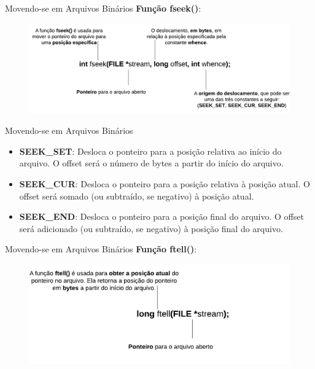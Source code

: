 \begin{frame}{Movendo-se em Arquivos Binários}
\textbf{Função fseek()}:
    \begin{figure}
        \centering
        \includegraphics[width=1\linewidth]{figuras/movebin.png}
    \end{figure}

\end{frame}


\begin{frame}{Movendo-se em Arquivos Binários}
    \begin{itemize}
        \item \textbf{SEEK\_SET}: Desloca o ponteiro para a posição relativa ao início do arquivo. O offset será o número de bytes a partir do início do arquivo.
        \item \textbf{SEEK\_CUR}: Desloca o ponteiro para a posição relativa à posição atual. O offset será somado (ou subtraído, se negativo) à posição atual.
        \item \textbf{SEEK\_END}: Desloca o ponteiro para a posição final do arquivo. O offset será adicionado (ou subtraído, se negativo) à posição final do arquivo.
    \end{itemize}
\end{frame}

\begin{frame}{Movendo-se em Arquivos Binários}
\textbf{Função ftell()}:
    \begin{figure}
        \centering
        \includegraphics[width=1\linewidth]{figuras/movebin2.png}
    \end{figure}

\end{frame}

